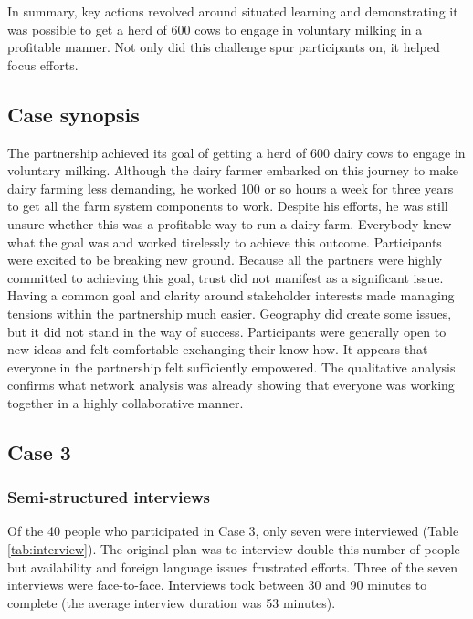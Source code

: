 In summary, key actions revolved around situated learning and demonstrating it was possible to get a herd of 600 cows to engage in voluntary milking in a profitable manner. Not only did this challenge spur participants on, it helped focus efforts. 

\subsection{Case synopsis}

The partnership achieved its goal of getting a herd of 600 dairy cows to engage in voluntary milking. Although the dairy farmer embarked on this journey to make dairy farming less demanding, he worked 100 or so hours a week for three years to get all the farm system components to work. Despite his efforts, he was still unsure whether this was a profitable way to run a dairy farm. Everybody knew what the goal was and worked tirelessly to achieve this outcome. Participants were excited to be breaking new ground. Because all the partners were highly committed to achieving this goal, trust did not manifest as a significant issue. Having a common goal and clarity around stakeholder interests made managing tensions within the partnership much easier. Geography did create some issues, but it did not stand in the way of success. Participants were generally open to new ideas and felt comfortable exchanging their know-how. It appears that everyone in the partnership felt sufficiently empowered. The qualitative analysis confirms what network analysis was already showing that everyone was working together in a highly collaborative manner. 

\subsection{Case 3}

\subsubsection{Semi-structured interviews}

Of the 40 people who participated in Case 3, only seven were interviewed (Table \ref{tab:interview}). The original plan was to interview double this number of people but availability and foreign language issues frustrated efforts. Three of the seven interviews were face-to-face. Interviews took between 30 and 90 minutes to complete (the average interview duration was 53 minutes). \medskip

